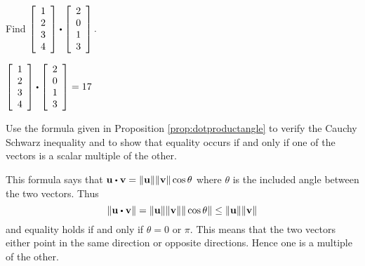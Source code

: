 \begin{enumialphparenastyle}

\begin{ex} Find $\leftB 
\begin{array}{r}
1 \\
2 \\
3 \\
4
\end{array}
\rightB \dotprod \leftB 
\begin{array}{r}
2 \\
0 \\
1 \\
3
\end{array}
\rightB .$
\begin{sol}
$\leftB \begin{array}{r}
1 \\
2 \\
3 \\
4
\end{array}
\rightB \dotprod \leftB \begin{array}{r}
2 \\
0 \\
1 \\
3
\end{array}
\rightB = 17$
\end{sol}
\end{ex}

\begin{ex} Use the formula given in Proposition \ref{prop:dotproductangle} to verify the Cauchy Schwarz inequality and
to show that equality occurs if and only if one of the vectors is a scalar
multiple of the other.
\begin{sol}
This formula says that $\vect{u}\dotprod \vect{v}=\vectlength
\vect{u}\vectlength \vectlength \vect{v}\vectlength \cos \theta $ where $
\theta $ is the included angle between the two vectors. Thus
\[
\vectlength \vect{u}\dotprod \vect{v}\vectlength =\vectlength \vect{u}\vectlength
\vectlength \vect{v}\vectlength \vectlength \cos \theta \vectlength \leq
\vectlength \vect{u}\vectlength \vectlength \vect{v}\vectlength
\]
and equality holds if and only if $\theta =0$ or $\pi $. This means that the
two vectors either point in the same direction or opposite directions. Hence
one is a multiple of the other.
\end{sol}
\end{ex}


\end{enumialphparenastyle}
